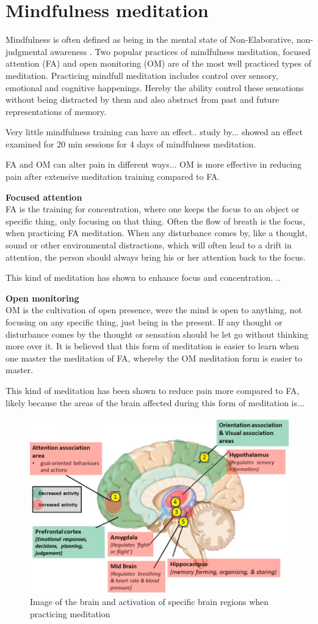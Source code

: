 \section{Mindfulness meditation}
Mindfulness is often defined as being in the mental state of Non-Elaborative, non-judgmental awareness \cite{Zeidan2012,Zeidan2016}. 
Two popular practices of mindfulness meditation, focused attention (FA) and open monitoring (OM) are of the most well practiced types of meditation. 
Practicing mindfull meditation includes control over sensory, emotional and cognitive happenings. Hereby the ability control these sensations without being distracted by them and also abstract from past and future representations of memory.

Very little mindfulness training can have an effect.. study by... showed an effect examined for 20 min sessions for 4 days of mindfulness meditation. 

FA and OM can alter pain in different ways...
OM is more effective in reducing pain after extensive meditation training compared to FA. 
\cite{Varilly2012}

\textbf{Focused attention}\\ 
FA is the training for concentration, where one keeps the focus to an object or specific thing, only focusing on that thing. Often the flow of breath is the focus, when practicing FA meditation.  When any disturbance comes by, like a thought, sound or other environmental distractions, which will often lead to a drift in attention, the person should always bring his or her attention back to the focus. 

This kind of meditation has shown to enhance focus and concentration. ..

\textbf{Open monitoring}\\
OM is the cultivation of open presence, were the mind is open to anything, not focusing on any specific thing, just being in the present. If any thought or disturbance comes by the thought or sensation should be let go without thinking more over it. It is believed that this form of meditation is easier to learn when one master the meditation of FA, whereby the OM meditation form is easier to master. 

This kind of meditation has been shown to reduce pain more compared to FA, likely because the areas of the brain affected during this form of meditation is...

\cite{Perlman2010}

\begin{figure}[H]
	\includegraphics[width=.8\textwidth]{figures/brain_meditation} 
	\caption{Image of the brain and activation of specific brain regions when practicing meditation}
	\label{fig:brain_meditation}  
\end{figure}                                         


